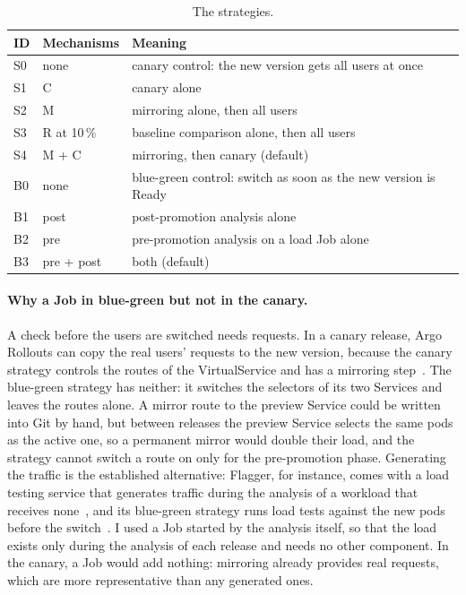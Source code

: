 \begin{table}[ht]
	\footnotesize
	\centering
	\begin{tabular}{ l l l }
		\toprule
		ID & Mechanisms & Meaning \\
		\midrule
		S0 & none & canary control: the new version gets all users at once \\
		S1 & C & canary alone \\
		S2 & M & mirroring alone, then all users \\
		S3 & R at 10\,\% & baseline comparison alone, then all users \\
		S4 & M + C & mirroring, then canary (default) \\
		\midrule
		B0 & none & blue-green control: switch as soon as the new version is Ready \\
		B1 & post & post-promotion analysis alone \\
		B2 & pre & pre-promotion analysis on a load Job alone \\
		B3 & pre + post & both (default) \\
		\bottomrule
	\end{tabular}
	\caption{The strategies.}
	\label{tab:EvalStrategies}
\end{table}

\paragraph{Why a Job in blue-green but not in the canary.} A check before the users are switched needs requests. In a canary release, Argo Rollouts can copy the real users' requests to the new version, because the canary strategy controls the routes of the VirtualService and has a mirroring step~\cite{ArgoRolloutsTraffic}. The blue-green strategy has neither: it switches the selectors of its two Services and leaves the routes alone. A mirror route to the preview Service could be written into Git by hand, but between releases the preview Service selects the same pods as the active one, so a permanent mirror would double their load, and the strategy cannot switch a route on only for the pre-promotion phase. Generating the traffic is the established alternative: Flagger, for instance, comes with a load testing service that generates traffic during the analysis of a workload that receives none~\cite{FlaggerWebhooks}, and its blue-green strategy runs load tests against the new pods before the switch~\cite{FlaggerStrategies}. I used a Job started by the analysis itself, so that the load exists only during the analysis of each release and needs no other component. In the canary, a Job would add nothing: mirroring already provides real requests, which are more representative than any generated ones.

